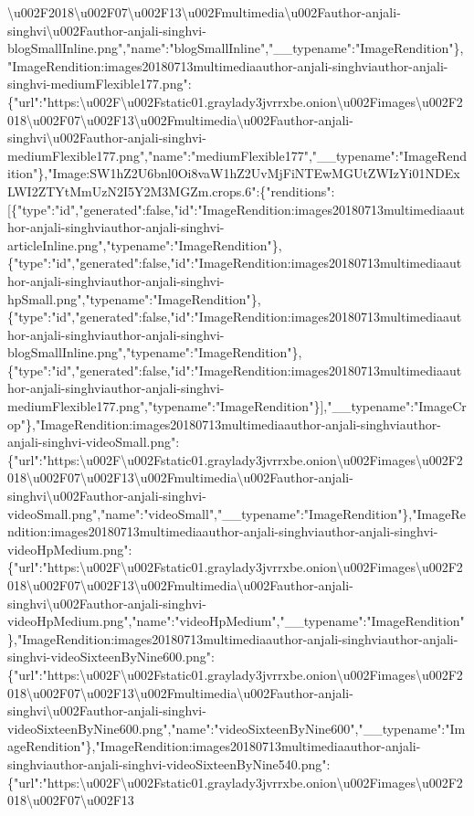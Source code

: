 \textbackslash{}u002F2018\textbackslash{}u002F07\textbackslash{}u002F13\textbackslash{}u002Fmultimedia\textbackslash{}u002Fauthor-anjali-singhvi\textbackslash{}u002Fauthor-anjali-singhvi-blogSmallInline.png","name":"blogSmallInline","\_\_typename":"ImageRendition"\},"ImageRendition:images20180713multimediaauthor-anjali-singhviauthor-anjali-singhvi-mediumFlexible177.png":\{"url":"https:\textbackslash{}u002F\textbackslash{}u002Fstatic01.graylady3jvrrxbe.onion\textbackslash{}u002Fimages\textbackslash{}u002F2018\textbackslash{}u002F07\textbackslash{}u002F13\textbackslash{}u002Fmultimedia\textbackslash{}u002Fauthor-anjali-singhvi\textbackslash{}u002Fauthor-anjali-singhvi-mediumFlexible177.png","name":"mediumFlexible177","\_\_typename":"ImageRendition"\},"Image:SW1hZ2U6bnl0Oi8vaW1hZ2UvMjFiNTEwMGUtZWIzYi01NDExLWI2ZTYtMmUzN2I5Y2M3MGZm.crops.6":\{"renditions":{[}\{"type":"id","generated":false,"id":"ImageRendition:images20180713multimediaauthor-anjali-singhviauthor-anjali-singhvi-articleInline.png","typename":"ImageRendition"\},\{"type":"id","generated":false,"id":"ImageRendition:images20180713multimediaauthor-anjali-singhviauthor-anjali-singhvi-hpSmall.png","typename":"ImageRendition"\},\{"type":"id","generated":false,"id":"ImageRendition:images20180713multimediaauthor-anjali-singhviauthor-anjali-singhvi-blogSmallInline.png","typename":"ImageRendition"\},\{"type":"id","generated":false,"id":"ImageRendition:images20180713multimediaauthor-anjali-singhviauthor-anjali-singhvi-mediumFlexible177.png","typename":"ImageRendition"\}{]},"\_\_typename":"ImageCrop"\},"ImageRendition:images20180713multimediaauthor-anjali-singhviauthor-anjali-singhvi-videoSmall.png":\{"url":"https:\textbackslash{}u002F\textbackslash{}u002Fstatic01.graylady3jvrrxbe.onion\textbackslash{}u002Fimages\textbackslash{}u002F2018\textbackslash{}u002F07\textbackslash{}u002F13\textbackslash{}u002Fmultimedia\textbackslash{}u002Fauthor-anjali-singhvi\textbackslash{}u002Fauthor-anjali-singhvi-videoSmall.png","name":"videoSmall","\_\_typename":"ImageRendition"\},"ImageRendition:images20180713multimediaauthor-anjali-singhviauthor-anjali-singhvi-videoHpMedium.png":\{"url":"https:\textbackslash{}u002F\textbackslash{}u002Fstatic01.graylady3jvrrxbe.onion\textbackslash{}u002Fimages\textbackslash{}u002F2018\textbackslash{}u002F07\textbackslash{}u002F13\textbackslash{}u002Fmultimedia\textbackslash{}u002Fauthor-anjali-singhvi\textbackslash{}u002Fauthor-anjali-singhvi-videoHpMedium.png","name":"videoHpMedium","\_\_typename":"ImageRendition"\},"ImageRendition:images20180713multimediaauthor-anjali-singhviauthor-anjali-singhvi-videoSixteenByNine600.png":\{"url":"https:\textbackslash{}u002F\textbackslash{}u002Fstatic01.graylady3jvrrxbe.onion\textbackslash{}u002Fimages\textbackslash{}u002F2018\textbackslash{}u002F07\textbackslash{}u002F13\textbackslash{}u002Fmultimedia\textbackslash{}u002Fauthor-anjali-singhvi\textbackslash{}u002Fauthor-anjali-singhvi-videoSixteenByNine600.png","name":"videoSixteenByNine600","\_\_typename":"ImageRendition"\},"ImageRendition:images20180713multimediaauthor-anjali-singhviauthor-anjali-singhvi-videoSixteenByNine540.png":\{"url":"https:\textbackslash{}u002F\textbackslash{}u002Fstatic01.graylady3jvrrxbe.onion\textbackslash{}u002Fimages\textbackslash{}u002F2018\textbackslash{}u002F07\textbackslash{}u002F13\textbacksl